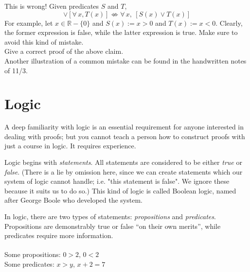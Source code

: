 \documentclass[12pt]{report}
\newcommand{\example}{  \noindent{\sc Example }\hspace{5pt} }
\newcommand{\exercise}{ \noindent{\sc Exercise }\hspace{5pt} }
\newcommand{\fall}{\forall\,}
\newcommand{\reals}{\mathbb{R}}
\begin{document}
This is wrong! Given predicates $S$ and $T$,\\
\begin{displaymath}
[\fall x,\ S(x)] \lor [\fall x, T(x)] \not \iff \fall x,\ [S(x) \lor T(x)]
\end{displaymath}
For example, let $x \in \reals - \{0\}$ and $S(x) := x > 0$ and $T(x) := x <
0$. Clearly, the former expression is false, while the latter expression is
true. Make sure to avoid this kind of mistake.\\

\exercise Give a correct proof of the above claim.\\


Another illustration of a common mistake can be found in the handwritten notes
of 11/3.




\chapter{Logic}
A deep familiarity with logic is an essential requirement for anyone
interested in dealing with proofs; but you cannot teach a person how to
construct proofs with just a course in logic. It requires experience.

Logic begins with {\em statements}. All statements are considered to be either
{\em true} or {\em false}. (There is a lie by omission here, since we can
create statements which our system of logic cannot handle; i.e. "this
statement is false". We ignore these because it suits us to do so.)  This kind
of logic is called Boolean logic, named after George Boole who developed the
system.

In logic, there are two types of statements: {\em
propositions} and 
{\em predicates}.
Propositions are demonstrably true or false ``on their own
merits'', while predicates require more information. \\


\example\\
Some propositions: $0 > 2$, $0 < 2$\\
Some predicates: $x > y$, $x + 2 = 7$\\
\end{document}
